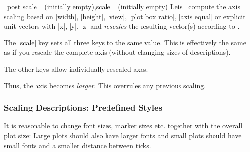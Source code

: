 \begin{pgfplotsxykeylist}{\x\ post scale= (initially empty),scale= (initially empty)}
	Lets \PGFPlots\ compute the axis scaling based on |width|, |height|, |view|, |plot box ratio|, |axis equal| or explicit unit vectors with |x|, |y|, |z| and \emph{rescales} the resulting vector(s) according to .

	The |scale| key sets all three keys to the same  value.	This is effectively the same as if you rescale the complete axis (without changing sizes of descriptions).

	The other keys allow individually rescaled axes.
\begin{codeexample}[]
\end{codeexample}
	Thus, the axis becomes \emph{larger}. This overrules any previous scaling.

\begin{codeexample}[]
\end{codeexample}
\end{pgfplotsxykeylist}

\subsubsection{Scaling Descriptions: Predefined Styles}
\label{sec:scaling:styles}
It is reasonable to change font sizes, marker sizes etc. together with the overall plot size: Large plots should also have larger fonts and small plots should have small fonts and a smaller distance between ticks.

